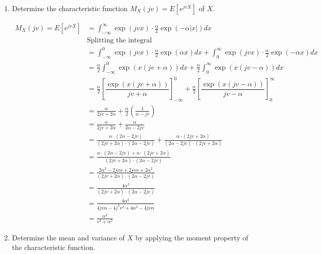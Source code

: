 \documentclass[11pt]{article}
\begin{document}
\begin{enumerate}[label=(\alph*)]
    \item Determine the characteristic function $M_X(jv) = E[e^{jvX}]$ of $X$.
    \begin{solution}
        \begin{align*}
            M_X(jv) = E[e^{jvX}] &= \int_{-\infty}^{\infty} \exp(jvx) \cdot \frac{\alpha}{2} \exp(-\alpha |x|) dx \\
            &\text{Splitting the integral} \\
            &= \int_{-\infty}^{0} \exp(jvx) \cdot \frac{\alpha}{2} \exp(\alpha x) dx + \int_{0}^{\infty} \exp(jvx) \cdot \frac{\alpha}{2} \exp(-\alpha x) dx \\
            &= \frac{\alpha}{2} \int_{-\infty}^{0} \exp(x(jv + \alpha)) dx + \frac{\alpha}{2} \int_{0}^{\infty} \exp(x(jv - \alpha)) dx \\
            &= \frac{\alpha}{2} \left[\dfrac{\exp(x(jv + \alpha))}{jv + \alpha}\right]_{-\infty}^{0} + \frac{\alpha}{2} \left[\dfrac{\exp(x(jv - \alpha))}{jv - \alpha}\right]_{0}^{\infty} \\
            &= \frac{\alpha}{2jv + 2\alpha} + \frac{\alpha}{2} \left( \frac{1}{\alpha - jv} \right) \\
            &= \frac{\alpha}{2jv + 2\alpha} + \frac{\alpha}{2\alpha - 2jv} \\
            &= \frac{\alpha\cdot(2\alpha - 2jv)}{(2jv + 2\alpha)\cdot(2\alpha - 2jv)} + \frac{\alpha\cdot(2jv + 2\alpha)}{(2\alpha - 2jv)\cdot(2jv + 2\alpha)} \\
            &= \frac{\alpha\cdot(2\alpha - 2jv) + \alpha\cdot(2jv + 2\alpha)}{(2jv + 2\alpha)\cdot(2\alpha - 2jv)} \\
            &= \frac{2\alpha^2 - 2jv\alpha + 2jv\alpha + 2\alpha^2}{(2jv + 2\alpha)\cdot(2\alpha - 2jv)} \\
            &= \frac{4\alpha^2}{(2jv + 2\alpha)\cdot(2\alpha - 2jv)} \\
            &= \frac{4\alpha^2}{4jv\alpha - 4j^2 v^2 + 4\alpha^2 - 4jv\alpha} \\
            &= \frac{\alpha^2}{v^2 + \alpha^2}
        \end{align*}
    \end{solution}

    \vspace{5em}

    \item Determine the mean and variance of $X$ by applying the moment property of the characteristic function.
    \begin{solution}


\end{solution}
\end{enumerate}
\end{document}
